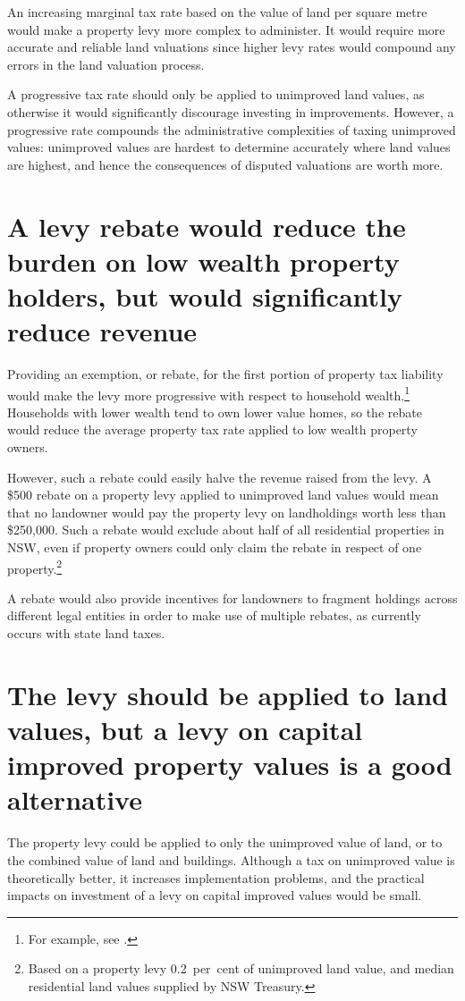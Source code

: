 \documentclass[twoside,english]{palatinob5portrait}
\begin{document}
An increasing marginal tax rate based on the value of land per square metre would make a property levy more complex to administer. It would require more accurate and reliable land valuations since higher levy rates would compound any errors in the land valuation process. 

A progressive tax rate should only be applied to unimproved land values, as otherwise it would significantly discourage investing in improvements. However, a progressive rate compounds the administrative complexities of taxing unimproved values: unimproved values are hardest to determine accurately where land values are highest, and hence the consequences of disputed valuations are worth more.

\section{\label{sec:PROP-6-2}A levy rebate would reduce the burden on low wealth property holders, but would significantly reduce revenue}
Providing an exemption, or rebate, for the first portion of property tax liability would make the levy more progressive with respect to household wealth.\footnote{For example, see \textcite[][8]{SlackBird2014}.}  Households with lower wealth tend to own lower value homes, so the rebate would reduce the average property tax rate applied to low wealth property owners.  \enlargethispage{0.5\baselineskip}

However, such a rebate could easily halve the revenue raised from the levy. A \$500 rebate on a property levy applied to unimproved land values would mean that no landowner would pay the property levy on landholdings worth less than \$250,000. Such a rebate would exclude about half of all residential properties in NSW, even if property owners could only claim the rebate in respect of one property.\footnote{Based on a property levy 0.2~per~cent of unimproved land value, and median residential land values supplied by NSW Treasury.}

A rebate would also provide incentives for landowners to fragment holdings across different legal entities in order to make use of multiple rebates, as currently occurs with state land taxes.

\section{\label{sec:PROP-6-3}The levy should be applied to land values, but a levy on capital improved property values is a good alternative}
The property levy could be applied to only the unimproved value of land, or to the combined value of land and buildings. Although a tax on unimproved value is theoretically better, it increases implementation problems, and the practical impacts on investment of a levy on capital improved values would be small. \enlargethispage{0.5\baselineskip}
\end{document}
